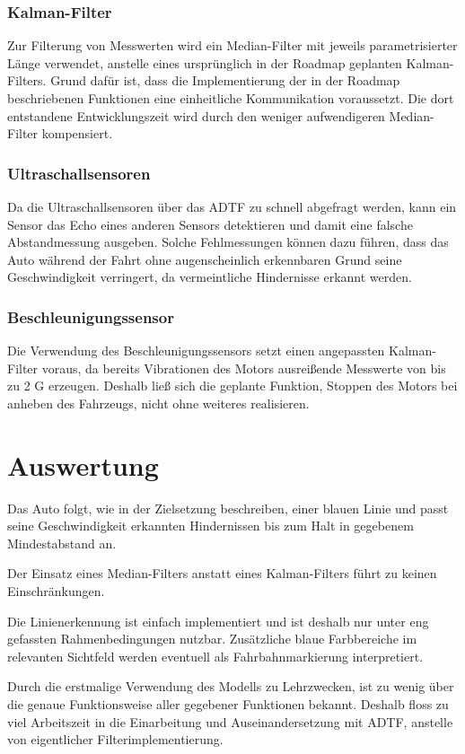 \documentclass[12pt, a4paper]{scrartcl}
\begin{document}
\subsubsection{Kalman-Filter}
Zur Filterung von Messwerten wird ein Median-Filter mit jeweils parametrisierter Länge verwendet, anstelle eines ursprünglich in der Roadmap geplanten Kalman-Filters. Grund dafür ist, dass die Implementierung der in der Roadmap beschriebenen Funktionen eine einheitliche Kommunikation voraussetzt. Die dort entstandene Entwicklungszeit wird durch den weniger aufwendigeren Median-Filter kompensiert.

\subsubsection{Ultraschallsensoren}
Da die Ultraschallsensoren über das ADTF zu schnell abgefragt werden, kann ein Sensor das Echo eines anderen Sensors detektieren und damit eine falsche Abstandmessung ausgeben. Solche Fehlmessungen können dazu führen, dass das Auto während der Fahrt ohne augenscheinlich erkennbaren Grund seine Geschwindigkeit verringert, da vermeintliche Hindernisse erkannt werden.

\subsubsection{Beschleunigungssensor}
Die Verwendung des Beschleunigungssensors setzt einen angepassten Kalman-Filter voraus, da bereits Vibrationen des Motors ausreißende Messwerte von bis zu 2 G erzeugen. Deshalb ließ sich die geplante Funktion, Stoppen des Motors bei anheben des Fahrzeugs, nicht ohne weiteres realisieren. 

\newpage
\section{Auswertung}
Das Auto folgt, wie in der Zielsetzung beschreiben, einer blauen Linie und passt seine Geschwindigkeit erkannten Hindernissen bis zum Halt in gegebenem Mindestabstand an.

Der Einsatz eines Median-Filters anstatt eines Kalman-Filters führt zu keinen Einschränkungen.

Die Linienerkennung ist einfach implementiert und ist deshalb nur unter eng gefassten Rahmenbedingungen nutzbar. Zusätzliche blaue Farbbereiche im relevanten Sichtfeld werden eventuell als Fahrbahnmarkierung interpretiert.

Durch die erstmalige Verwendung des Modells zu Lehrzwecken, ist zu wenig über die genaue Funktionsweise aller gegebener Funktionen bekannt. Deshalb floss zu viel Arbeitszeit in die Einarbeitung und Auseinandersetzung mit ADTF, anstelle von eigentlicher Filterimplementierung.
\end{document}
